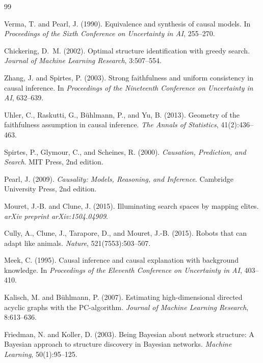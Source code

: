 \documentclass{article}
\theoremstyle{definition}
\theoremstyle{plain}
\theoremstyle{remark}
\begin{document}
\begin{thebibliography}{99}

Verma, T. and Pearl, J. (1990).
Equivalence and synthesis of causal models.
In \textit{Proceedings of the Sixth Conference on Uncertainty in AI}, 255--270.

Chickering, D.~M. (2002).
Optimal structure identification with greedy search.
\textit{Journal of Machine Learning Research}, 3:507--554.

Zhang, J. and Spirtes, P. (2003).
Strong faithfulness and uniform consistency in causal inference.
In \textit{Proceedings of the Nineteenth Conference on Uncertainty in AI}, 632--639.

Uhler, C., Raskutti, G., B\"uhlmann, P., and Yu, B. (2013).
Geometry of the faithfulness assumption in causal inference.
\textit{The Annals of Statistics}, 41(2):436--463.

Spirtes, P., Glymour, C., and Scheines, R. (2000).
\textit{Causation, Prediction, and Search}.
MIT Press, 2nd edition.

Pearl, J. (2009).
\textit{Causality: Models, Reasoning, and Inference}.
Cambridge University Press, 2nd edition.

Mouret, J.-B. and Clune, J. (2015).
Illuminating search spaces by mapping elites.
\textit{arXiv preprint arXiv:1504.04909}.

Cully, A., Clune, J., Tarapore, D., and Mouret, J.-B. (2015).
Robots that can adapt like animals.
\textit{Nature}, 521(7553):503--507.

Meek, C. (1995).
Causal inference and causal explanation with background knowledge.
In \textit{Proceedings of the Eleventh Conference on Uncertainty in AI}, 403--410.

Kalisch, M. and B\"uhlmann, P. (2007).
Estimating high-dimensional directed acyclic graphs with the PC-algorithm.
\textit{Journal of Machine Learning Research}, 8:613--636.

Friedman, N. and Koller, D. (2003).
Being Bayesian about network structure: A Bayesian approach to structure
discovery in Bayesian networks.
\textit{Machine Learning}, 50(1):95--125.


\end{thebibliography}
\end{document}
